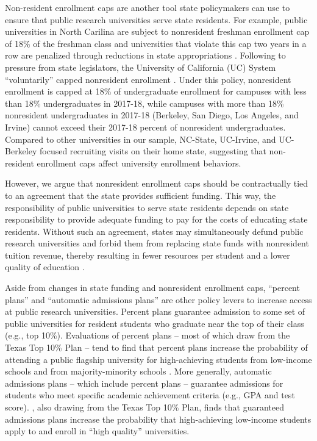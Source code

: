 \documentclass[twoside]{article}
\begin{document}
Non-resident enrollment caps are another tool state policymakers can use to ensure that public research universities serve state residents.  For example, public universities in North Carilina are subject to nonresident freshman enrollment cap of 18\% of the freshman class and universities that violate this cap two years in a row are penalized through reductions in state appropriations \citep{RN4424}. Following to pressure from state legislators, the  University of California (UC) System ``voluntarily'' capped nonresident enrollment \citep{RN4433}. Under this policy, nonresident enrollment is capped at 18\% of undergraduate enrollment for campuses with less than 18\% undergraduates in 2017-18, while campuses with more than 18\% nonresident undergraduates in 2017-18 (Berkeley, San Diego, Los Angeles, and Irvine) cannot exceed their 2017-18 percent of nonresident undergraduates.  Compared to other universities in our sample, NC-State, UC-Irvine, and UC-Berkeley focused recruiting visits on their home state, suggesting that non-resident enrollment caps affect university enrollment behaviors.

However, we argue that nonresident enrollment caps should be contractually tied to an agreement that the state provides sufficient funding. This way, the responsibility of public universities to serve state residents depends on state responsibility to provide adequate funding to pay for the costs of educating state residents.  Without such an agreement, states may simultaneously defund public research universities and forbid them from replacing state funds with nonresident tuition revenue, thereby resulting in fewer resources per student and a lower quality of education \citep{RN532}.

Aside from changes in state funding and nonresident enrollment caps, ``percent plans'' and ``automatic admissions plans'' are other policy levers to increase access at public research universities.  Percent plans guarantee admission to some set of public universities for resident students who graduate near the top of their class (e.g., top 10\%).  Evaluations of percent plans -- most of which draw from the Texas Top 10\% Plan -- tend to find that percent plans increase the probability of attending a public flagship university for high-achieving students from low-income schools and from majority-minority schools \citep{RN4434,RN4435,RN4437,RN4436}.  More generally, automatic admissions plans -- which include percent plans -- guarantee admissions for students who meet specific academic achievement criteria (e.g., GPA and test score).  \cite{RN4428}, also drawing from the Texas Top 10\% Plan, finds that guaranteed admissions plans increase the probability that high-achieving low-income students apply to and enroll in ``high quality'' universities.
\end{document}
